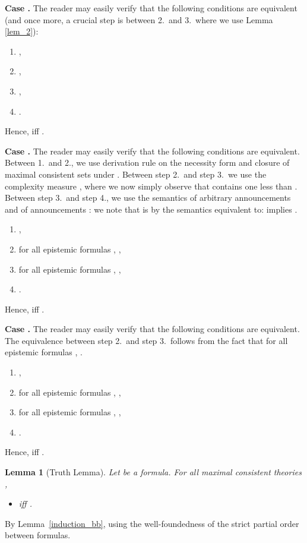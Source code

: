 \documentclass{article}[12pt]
\newtheorem{lemma}{Lemma}
\newenvironment{proof}{\noindent {\bf Proof \ }}{\hfill ~}
\begin{document}
\begin{proof}
\medskip \noindent 
{\bf Case .}
The reader may easily verify that the following conditions are equivalent (and once more, a crucial step is between 2.\ and 3.\, where we use Lemma \ref{lem_2}): 
\begin{enumerate}
\item ,
\item ,
\item ,
\item .
\end{enumerate}
Hence,  iff .


\medskip \noindent 
{\bf Case .}
The reader may easily verify that the following conditions are equivalent. Between 1.\ and 2., we use derivation rule  on the necessity form  and closure of maximal consistent sets under . Between step 2.\ and step 3.\, we use the complexity measure , where we now simply observe that  contains one  less than . Between step 3.\ and step 4., we use the semantics of arbitrary announcements  and of announcements : we note that   is by the semantics equivalent to:  implies .
\begin{enumerate}
\item ,
\item for all epistemic formulas , ,
\item for all epistemic formulas , ,
\item .
\end{enumerate}
Hence,  iff .


\medskip \noindent 
{\bf Case .}
The reader may easily verify that the following conditions are equivalent.
The equivalence between step 2.\ and step 3.\ follows from the fact that for all epistemic formulas , .
\begin{enumerate}
\item ,
\item for all epistemic formulas , ,
\item for all epistemic formulas , ,
\item .
\end{enumerate}
Hence,  iff .
\end{proof}
\begin{lemma}[Truth Lemma] \label{equ_sem}
Let  be a formula.
For all maximal consistent theories ,
\begin{itemize}
\item  iff .
\end{itemize}
\end{lemma}
\begin{proof}
By Lemma~\ref{induction_bb}, using the well-foundedness of the strict partial order  between formulas.
\end{proof}
\end{document}
